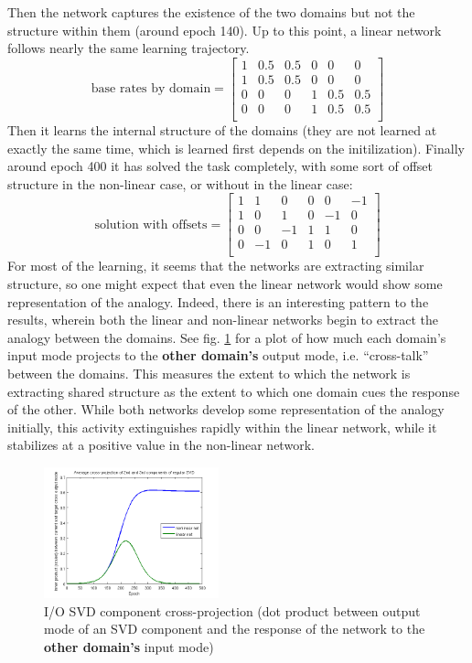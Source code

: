 \documentclass[10pt,letterpaper]{article}
\begin{document}
Then the network captures the existence of the two domains but not the structure within them (around epoch 140). Up to this point, a linear network follows nearly the same learning trajectory.
{ 
\[
\text{base rates by domain} = \left[ \begin{matrix} 
1 & 0.5 & 0.5 & 0 & 0 & 0 \\
1 & 0.5 & 0.5 & 0 & 0 & 0 \\
0 & 0 & 0 & 1 & 0.5 & 0.5  \\
0 & 0 & 0 & 1 & 0.5 & 0.5  \\
\end{matrix}  \right] 
\] 
}
Then it learns the internal structure of the domains (they are not learned at exactly the same time, which is learned first depends on the initilization). Finally around epoch 400 it has solved the task completely, with some sort of offset structure in the non-linear case, or without in the linear case:
{ 
\[
\text{solution with offsets} = \left[ \begin{matrix} 
1 & 1 & 0 & 0 & 0 & -1 \\
1 & 0 & 1 & 0 & -1 & 0 \\
 0 & 0 & -1 & 1 & 1 & 0\\
 0 & -1 & 0 & 1 & 0 & 1\\
\end{matrix}  \right] 
\]
}
For most of the learning, it seems that the networks are extracting similar structure, so one might expect that even the linear network would show some representation of the analogy. Indeed, there is an interesting pattern to the results, wherein both the linear and non-linear networks begin to extract the analogy between the domains. See fig. \ref{SVD_cross_projection_learning} for a plot of how much each domain's input mode projects to the \textbf{other domain's} output mode, i.e. ``cross-talk'' between the domains. This measures the extent to which the network is extracting shared structure as the extent to which one domain cues the response of the other. While both networks develop some representation of the analogy initially, this activity extinguishes rapidly within the linear network, while it stabilizes at a positive value in the non-linear network. \par
\begin{figure}[H]
\includegraphics[width=0.45\textwidth]{figures/SVD_cross_projection_learning.png}
\caption{I/O SVD component cross-projection (dot product between output mode of an SVD component and the response of the network to the \textbf{other domain's} input mode)}
\label{SVD_cross_projection_learning}
\end{figure}
\end{document}
